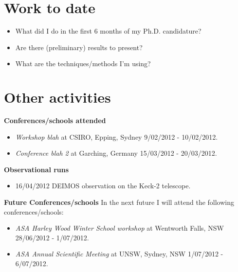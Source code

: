 \documentclass[useAMS,usenatbib,onecolumn]{mnras}
\begin{document}
\section{Work to date}

\begin{itemize}
	\item{What did I do in the first 6 months of my Ph.D. candidature?}
	\item{Are there (preliminary) results to present?}
	\item{What are the techniques/methods I'm using?}
\end{itemize}

\section{Other activities}

	\noindent\textbf{Conferences/schools attended}
	\begin{itemize}
  		\item{\textit{Workshop blah}} at CSIRO, Epping, Sydney 9/02/2012 - 10/02/2012.
  		\item{\textit{Conference blah 2}} at Garching, Germany 15/03/2012 - 20/03/2012.
	\end{itemize}

	\textbf{Observational runs}
	\begin{itemize}
		\item{16/04/2012} DEIMOS observation on the Keck-2 telescope.
	\end{itemize}

	\textbf{Future Conferences/schools}
	In the next future I will attend the following conferences/schools:
	\begin{itemize}
		\item{\textit{ASA Harley Wood Winter School workshop}} at Wentworth Falls, NSW 28/06/2012 - 1/07/2012.
		\item{\textit{ASA Annual Scientific Meeting}} at UNSW, Sydney, NSW 1/07/2012 - 6/07/2012.
	\end{itemize}


\end{document}
